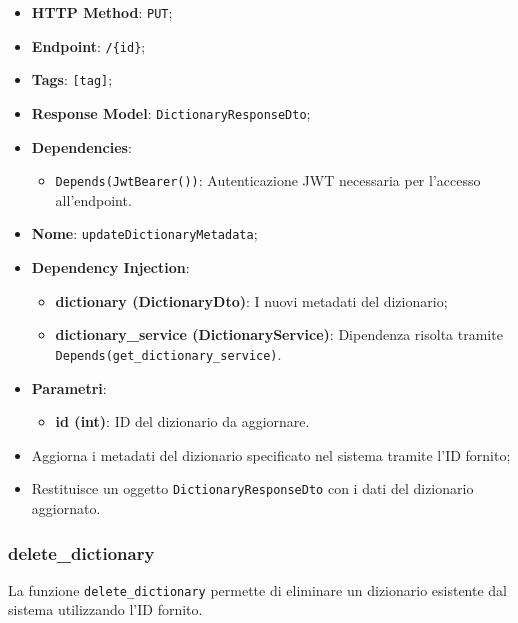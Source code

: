 \begin{itemize}
\item \textbf{HTTP Method}: \texttt{PUT};
\item \textbf{Endpoint}: \texttt{/\{id\}};
\item \textbf{Tags}: \texttt{[tag]};
\item \textbf{Response Model}: \texttt{DictionaryResponseDto};
\item \textbf{Dependencies}:
\begin{itemize}
\item \texttt{Depends(JwtBearer())}: Autenticazione JWT necessaria per l'accesso all'endpoint.
\end{itemize}
\item \textbf{Nome}: \texttt{updateDictionaryMetadata};
\item \textbf{Dependency Injection}:
\begin{itemize}
\item \textbf{dictionary (DictionaryDto)}: I nuovi metadati del dizionario;
\item \textbf{dictionary\_service (DictionaryService)}: Dipendenza risolta tramite \texttt{Depends(get\_dictionary\_service)}.
\end{itemize}
\item \textbf{Parametri}:
\begin{itemize}
\item \textbf{id (int)}: ID del dizionario da aggiornare.
\end{itemize}
\end{itemize}

\begin{itemize}
\item Aggiorna i metadati del dizionario specificato nel sistema tramite l'ID fornito;
\item Restituisce un oggetto \texttt{DictionaryResponseDto} con i dati del dizionario aggiornato.
\end{itemize}

\subsubsection{delete\_dictionary}

\par La funzione \texttt{delete\_dictionary} permette di eliminare un dizionario esistente dal sistema utilizzando l'ID fornito.

